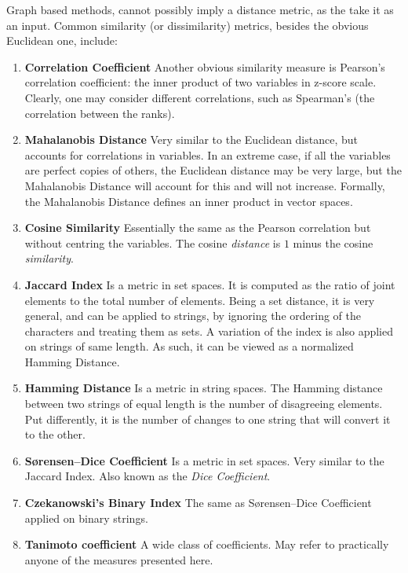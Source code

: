 Graph based methods, cannot possibly imply a distance metric, as the take it as an input.
Common similarity (or dissimilarity) metrics, besides the obvious Euclidean one, include:
\begin{enumerate}
\item \textbf{Correlation Coefficient} Another obvious similarity measure is Pearson's correlation coefficient: the inner product of two variables in z-score scale. Clearly, one may consider different correlations, such as Spearman's (the correlation between the ranks).

\item \textbf{Mahalanobis Distance} Very similar to the Euclidean distance, but accounts for correlations in variables. In an extreme case, if all the variables are perfect copies of others, the Euclidean distance may be very large, but the Mahalanobis Distance will account for this and will not increase. 
Formally, the Mahalanobis Distance defines an inner product in vector spaces.

\item \textbf{Cosine Similarity} Essentially the same as the Pearson correlation but without centring the variables. 
The cosine \emph{distance} is $1$ minus the cosine \emph{similarity}.

\item \textbf{Jaccard Index} Is a metric in set spaces. It is computed as the ratio of joint elements to the total number of elements. Being a set distance, it is very general, and can be applied to strings, by ignoring the ordering of the characters and treating them as sets.
A variation of the index is also applied on strings of same length. As such, it can be viewed as a normalized Hamming Distance.

\item \textbf{Hamming Distance} Is a metric in string spaces. The Hamming distance between two strings of equal length is the number of disagreeing elements. Put differently, it is the number of changes to one string that will convert it to the other.

\item \textbf{Sørensen–Dice Coefficient}  Is a metric in set spaces. Very similar to the Jaccard Index. Also known as the \emph{Dice Coefficient}.

\item \textbf{Czekanowski's Binary Index}  The same as Sørensen–Dice Coefficient applied on binary strings.

\item \textbf{Tanimoto coefficient} A wide class of coefficients. May refer to practically anyone of the measures presented here.


\end{enumerate}
